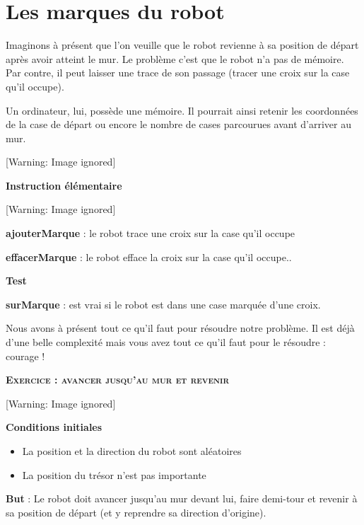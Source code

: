 \section{Les marques du robot}
{
Imaginons à présent que l'on veuille que le robot
revienne à sa position de départ après avoir atteint le mur. Le
problème c'est que le robot n'a pas
de mémoire. Par contre, il peut laisser une trace de son passage
(tracer une croix sur la case qu'il occupe).}

{
Un ordinateur, lui, possède une mémoire. Il pourrait ainsi retenir les
coordonnées de la case de départ ou encore le nombre de cases
parcourues avant d'arriver au mur.}

\begin{center}
 [Warning: Image ignored] %

\end{center}
{\bfseries
Instruction élémentaire}

\begin{center}
 [Warning: Image ignored] %

\end{center}
{\sffamily
\textbf{ajouterMarque} : le robot trace une croix sur la case
qu'il occupe}

{\sffamily
\textbf{effacerMarque} : le robot efface la croix sur la case
qu'il occupe..}

{\bfseries
Test }

{\sffamily
\textbf{surMarque} : est vrai si le robot est dans une case marquée
d'une croix.}

{
Nous avons à présent tout ce qu'il faut pour résoudre
notre problème. Il est déjà d'une belle complexité
mais vous avez tout ce qu'il faut pour le résoudre :
courage !}

{\sffamily\bfseries\scshape
Exercice : avancer jusqu'au mur et revenir}

\begin{center}
 [Warning: Image ignored] %

\end{center}
{\bfseries
Conditions initiales}

\liststyleListv
\begin{itemize}
\item {
La position et la direction du robot sont aléatoires}
\item {
La position du trésor n'est pas importante}
\end{itemize}
{
\textbf{But} : Le robot doit avancer jusqu'au mur
devant lui, faire demi-tour et revenir à sa position de départ (et y
reprendre sa direction d'origine).}


